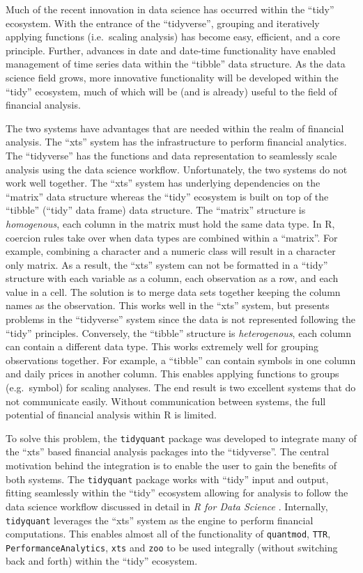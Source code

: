Much of the recent innovation in data science has occurred within the
``tidy'' ecosystem. With the entrance of the ``tidyverse'', grouping and
iteratively applying functions (i.e.~scaling analysis) has become easy,
efficient, and a core principle. Further, advances in date and date-time
functionality have enabled management of time series data within the
``tibble'' data structure. As the data science field grows, more
innovative functionality will be developed within the ``tidy''
ecosystem, much of which will be (and is already) useful to the field of
financial analysis.

The two systems have advantages that are needed within the realm of
financial analysis. The ``xts'' system has the infrastructure to perform
financial analytics. The ``tidyverse'' has the functions and data
representation to seamlessly scale analysis using the data science
workflow. Unfortunately, the two systems do not work well together. The
``xts'' system has underlying dependencies on the ``matrix'' data
structure whereas the ``tidy'' ecosystem is built on top of the
``tibble'' (``tidy'' data frame) data structure. The ``matrix''
structure is \emph{homogenous}, each column in the matrix must hold the
same data type. In R, coercion rules take over when data types are
combined within a ``matrix''. For example, combining a character and a
numeric class will result in a character only matrix. As a result, the
``xts'' system can not be formatted in a ``tidy'' structure with each
variable as a column, each observation as a row, and each value in a
cell. The solution is to merge data sets together keeping the column
names as the observation. This works well in the ``xts'' system, but
presents problems in the ``tidyverse'' system since the data is not
represented following the ``tidy'' principles. Conversely, the
``tibble'' structure is \emph{heterogenous}, each column can contain a
different data type. This works extremely well for grouping observations
together. For example, a ``tibble'' can contain symbols in one column
and daily prices in another column. This enables applying functions to
groups (e.g.~symbol) for scaling analyses. The end result is two
excellent systems that do not communicate easily. Without communication
between systems, the full potential of financial analysis within R is
limited.

To solve this problem, the \texttt{tidyquant} package was developed to
integrate many of the ``xts'' based financial analysis packages into the
``tidyverse''. The central motivation behind the integration is to
enable the user to gain the benefits of both systems. The
\texttt{tidyquant} package works with ``tidy'' input and output, fitting
seamlessly within the ``tidy'' ecosystem allowing for analysis to follow
the data science workflow discussed in detail in \emph{R for Data
Science} \citep{R4DS2017}. Internally, \texttt{tidyquant} leverages the
``xts'' system as the engine to perform financial computations. This
enables almost all of the functionality of \texttt{quantmod},
\texttt{TTR}, \texttt{PerformanceAnalytics}, \texttt{xts} and
\texttt{zoo} to be used integrally (without switching back and forth)
within the ``tidy'' ecosystem.

